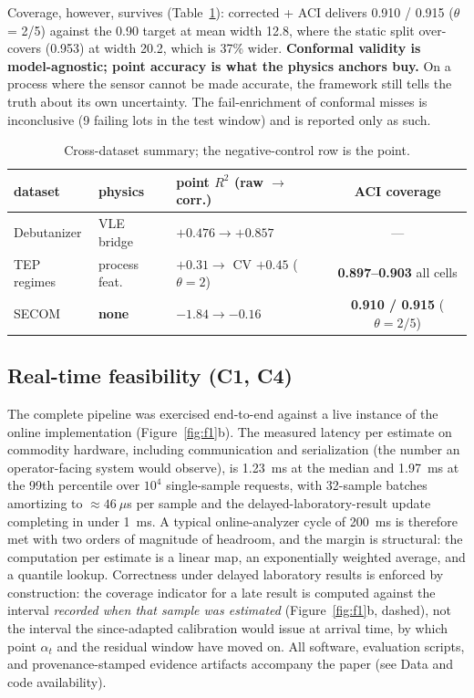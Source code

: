 Coverage, however, survives (Table~\ref{tab:t3}): corrected + ACI delivers 0.910 / 0.915 ($\theta$ =
2/5) against the 0.90 target at mean width 12.8, where the static split over-covers
(0.953) at width 20.2, which is 37\% wider. \textbf{Conformal validity is model-agnostic; point
accuracy is what the physics anchors buy.} On a process where the sensor cannot be
made accurate, the framework still tells the truth about its own uncertainty. The
fail-enrichment of conformal misses is inconclusive (9 failing lots in the test
window) and is reported only as such.


\begin{table}[t]
\centering\small
\caption{Cross-dataset summary; the negative-control row is the point.}
\label{tab:t3}
\begin{tabular}{@{}lllc@{}}
\toprule
dataset & physics & point $R^2$ (raw $\to$ corr.) & ACI coverage \\
\midrule
Debutanizer & VLE bridge & $+0.476 \to \mathbf{+0.857}$ & --- \\
TEP regimes & process feat. & $+0.31 \to$ CV $+0.45$ ($\theta{=}2$) & \textbf{0.897--0.903} all cells \\
SECOM & \textbf{none} & $-1.84 \to -0.16$ & \textbf{0.910 / 0.915} ($\theta{=}2/5$) \\
\bottomrule
\end{tabular}
\end{table}

\subsection{Real-time feasibility (C1, C4)}

The complete pipeline was exercised end-to-end against a live instance of the
online implementation (Figure~\ref{fig:f1}b). The measured latency per estimate on
commodity hardware, including communication and serialization (the number an
operator-facing system would observe), is 1.23~ms at the median and 1.97~ms at the
99th percentile over $10^4$ single-sample requests, with 32-sample batches amortizing
to ${\approx}46~\mu$s per sample and the delayed-laboratory-result update completing
in under 1~ms. A typical online-analyzer cycle of 200~ms is therefore met with two
orders of magnitude of headroom, and the margin is structural: the computation per
estimate is a linear map, an exponentially weighted average, and a quantile lookup.
Correctness under delayed laboratory results is enforced by construction: the
coverage indicator for a late result is computed against the interval \emph{recorded
when that sample was estimated} (Figure~\ref{fig:f1}b, dashed), not the interval the
since-adapted calibration would issue at arrival time, by which point $\alpha_t$
and the residual window have moved on. All software, evaluation scripts, and
provenance-stamped evidence artifacts accompany the paper (see Data and code
availability).

